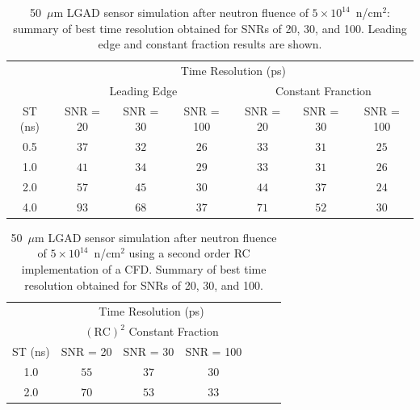 \documentclass[preprint,1p]{elsarticle}
\begin{document}
 \begin{table}\label{tab:shaping_time_5e14}
     \begin{tabular}{c|ccc|ccc}
     \multicolumn{1}{c}{}& \multicolumn{6}{c}{Time Resolution (ps)} \\
     \multicolumn{1}{c}{}&\multicolumn{3}{c}{Leading Edge} & \multicolumn{3}{c}{Constant Franction}\\ \hline
     ST (ns) & SNR = 20   & SNR = 30      & SNR = 100     & SNR = 20      & SNR = 30      & SNR = 100 \\
     0.5 & $37$  & $32$  & $26$  & $33$  & $31$  & $25$ \\
     1.0 & $41$  & $34$  & $29$  & $33$  & $31$  & $26$ \\
     2.0 & $57$  & $45$  & $30$  & $44$  & $37$  & $24$ \\
     4.0 & $93$  & $68$  & $37$  & $71$  & $52$  & $30$ \\
     \end{tabular}
     \caption{50~$\mu$m LGAD sensor simulation after neutron fluence of
      $5\times 10^{14}$~n/cm$^2$: summary of best time resolution obtained for SNRs
     of 20, 30, and 100. Leading edge and constant fraction results are shown.}
  \end{table}

 \begin{table}\label{tab:shaping_time_5e14_psCFD}
     \begin{tabular}{c|ccc|ccc}
     \multicolumn{1}{c}{}& \multicolumn{3}{c}{Time Resolution (ps)} \\
     \multicolumn{1}{c}{}& \multicolumn{3}{c}{$\mathrm{(RC)}^{2}$ Constant Fraction}\\ \hline
     ST (ns) & SNR = 20      & SNR = 30      & SNR = 100 \\
     1.0 & $55$  & $ 37$  & $30$ \\
     2.0 & $70$  & $ 53$  & $33$ \\     
     \end{tabular}
     \caption{50~$\mu$m LGAD sensor simulation after neutron fluence of
      $5\times 10^{14}$~n/cm$^2$ using a second order RC implementation of a CFD. 
      Summary of best time resolution obtained for SNRs
     of 20, 30, and 100. }
  \end{table}
\end{document}
